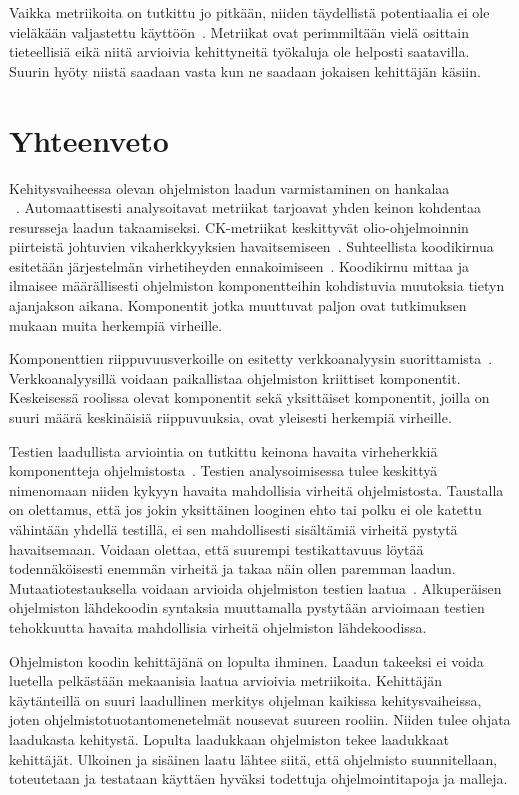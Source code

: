 \documentclass[finnish]{../tktltiki2}
\theoremstyle{definition}
\theoremstyle{remark}
\begin{document}
    Vaikka metriikoita on tutkittu jo pitkään, niiden täydellistä potentiaalia ei ole vieläkään valjastettu 
käyttöön~\cite{YH11}. Metriikat ovat perimmiltään vielä osittain tieteellisiä eikä niitä arvioivia kehittyneitä työkaluja 
ole helposti saatavilla. Suurin hyöty niistä saadaan vasta kun ne saadaan jokaisen kehittäjän käsiin. 

\section{Yhteenveto}

Kehitysvaiheessa olevan ohjelmiston laadun varmistaminen on hankalaa\\~\cite{BBM96, NB05, NB07, ZN08, MNDT09}. 
Automaattisesti analysoitavat metriikat tarjoavat yhden keinon kohdentaa resursseja laadun takaamiseksi. CK-metriikat 
keskittyvät olio-ohjelmoinnin piirteistä johtuvien vikaherkkyyksien havaitsemiseen~\cite{CK94, BBM96}. Suhteellista 
koodikirnua esitetään järjestelmän virhetiheyden ennakoimiseen~\cite{NB05}. Koodikirnu mittaa ja ilmaisee määrällisesti 
ohjelmiston komponentteihin kohdistuvia muutoksia tietyn ajanjakson aikana. Komponentit jotka muuttuvat paljon ovat 
tutkimuksen mukaan muita herkempiä virheille.

    Komponenttien riippuvuusverkoille on esitetty verkkoanalyysin suorittamista~\cite{ZN08}. Verkkoanalyysillä voidaan 
paikallistaa ohjelmiston kriittiset komponentit. Keskeisessä roolissa olevat komponentit sekä yksittäiset komponentit, 
joilla on suuri määrä keskinäisiä riippuvuuksia, ovat yleisesti herkempiä virheille.

    Testien laadullista arviointia on tutkittu keinona havaita virheherkkiä komponentteja ohjelmistosta~\cite{MNDT09}. 
Testien analysoimisessa tulee keskittyä nimenomaan niiden kykyyn havaita mahdollisia virheitä ohjelmistosta. Taustalla 
on olettamus, että jos jokin yksittäinen looginen ehto tai polku ei ole katettu vähintään yhdellä testillä, ei sen 
mahdollisesti sisältämiä virheitä pystytä havaitsemaan. Voidaan olettaa, että suurempi testikattavuus löytää 
todennäköisesti enemmän virheitä ja takaa näin ollen paremman laadun. Mutaatiotestauksella voidaan arvioida ohjelmiston 
testien laatua~\cite{YH11}. Alkuperäisen ohjelmiston lähdekoodin syntaksia muuttamalla pystytään arvioimaan testien 
tehokkuutta havaita mahdollisia virheitä ohjelmiston lähdekoodissa.

    Ohjelmiston koodin kehittäjänä on lopulta ihminen. Laadun takeeksi ei voida luetella pelkästään mekaanisia 
laatua arvioivia metriikoita. Kehittäjän käytänteillä on suuri laadullinen merkitys ohjelman kaikissa kehitysvaiheissa, 
joten ohjelmistotuotantomenetelmät nousevat suureen rooliin. Niiden tulee ohjata laadukasta kehitystä. Lopulta 
laadukkaan ohjelmiston tekee laadukkaat kehittäjät. Ulkoinen ja sisäinen laatu lähtee siitä, että ohjelmisto 
suunnitellaan, toteutetaan ja testataan käyttäen hyväksi todettuja ohjelmointitapoja ja malleja.
\end{document}
